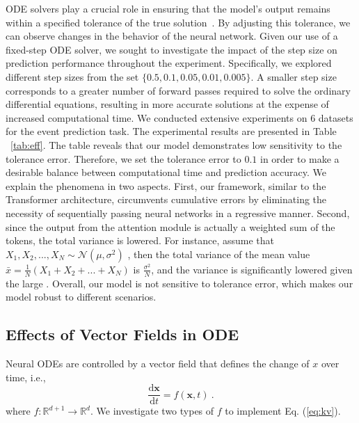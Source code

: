 ODE solvers play a crucial role in ensuring that the model's output remains within a specified tolerance of the true solution~\cite{chen2018neural}. By adjusting this tolerance, we can observe changes in the behavior of the neural network. Given our use of a fixed-step ODE solver, we sought to investigate the impact of the step size on prediction performance throughout the experiment. Specifically, we explored different step sizes from the set $\{0.5, 0.1, 0.05, 0.01, 0.005\}$. A smaller step size corresponds to a greater number of forward passes required to solve the ordinary differential equations, resulting in more accurate solutions at the expense of increased computational time. We conducted extensive experiments on 6 datasets for the event prediction task. The experimental results are presented in Table ~\ref{tab:eff}. The table reveals that our model demonstrates low sensitivity to the tolerance error. Therefore, we set the tolerance error to $0.1$ in order to make a desirable balance between computational time and prediction accuracy. We explain the phenomena in two aspects. First, our framework, similar to the Transformer architecture, circumvents cumulative errors by eliminating the necessity of sequentially passing neural networks in a regressive manner. Second, since the output from the attention module is actually a weighted sum of the tokens, the total variance is lowered. For instance, assume that $X_1, X_2, ..., X_N \sim \mathcal{N}(\mu, \sigma^2)$
, then the total variance of the mean value $\bar{x}=\frac{1}{N} (X_1+X_2+...+X_N)$ is $\frac{\sigma^2}{N}$, and the variance is significantly lowered given the large 
. Overall, our model is not sensitive to tolerance error, which makes our model robust to different scenarios.


\subsection{Effects of Vector Fields in ODE}

Neural ODEs are controlled by a vector field that defines the change of $x$ over time, i.e.,
\begin{equation}
    \frac{\text{d} \textbf{x}}{\text{d} t} = f(\textbf{x}, t) ~.
\end{equation}
where $f: \mathbb{R}^{d+1} \rightarrow \mathbb{R}^{d}$. We investigate two types of $f$ to implement Eq. (\ref{eq:kv}). 

